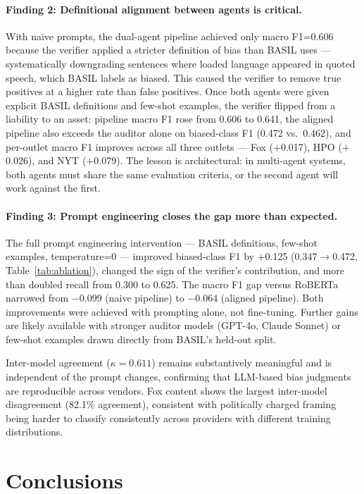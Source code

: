 \documentclass[11pt]{article}
\begin{document}
\paragraph{Finding 2: Definitional alignment between agents is critical.}
With naive prompts, the dual-agent pipeline achieved only macro F1{=}0.606 because the verifier applied a stricter definition of bias than BASIL uses --- systematically downgrading sentences where loaded language appeared in quoted speech, which BASIL labels as biased. This caused the verifier to remove true positives at a higher rate than false positives. Once both agents were given explicit BASIL definitions and few-shot examples, the verifier flipped from a liability to an asset: pipeline macro F1 rose from 0.606 to 0.641, the aligned pipeline also exceeds the auditor alone on biased-class F1 (0.472 vs.\ 0.462), and per-outlet macro F1 improves across all three outlets --- Fox ($+$0.017), HPO ($+$0.026), and NYT ($+$0.079). The lesson is architectural: in multi-agent systems, both agents must share the same evaluation criteria, or the second agent will work against the first.

\paragraph{Finding 3: Prompt engineering closes the gap more than expected.}
The full prompt engineering intervention --- BASIL definitions, few-shot examples, temperature{=}0 --- improved biased-class F1 by $+$0.125 (0.347$\rightarrow$0.472, Table~\ref{tab:ablation}), changed the sign of the verifier's contribution, and more than doubled recall from 0.300 to 0.625. The macro F1 gap versus RoBERTa narrowed from $-$0.099 (naive pipeline) to $-$0.064 (aligned pipeline). Both improvements were achieved with prompting alone, not fine-tuning. Further gains are likely available with stronger auditor models (GPT-4o, Claude Sonnet) or few-shot examples drawn directly from BASIL's held-out split.

Inter-model agreement ($\kappa{=}0.611$) remains substantively meaningful and is independent of the prompt changes, confirming that LLM-based bias judgments are reproducible across vendors. Fox content shows the largest inter-model disagreement (82.1\% agreement), consistent with politically charged framing being harder to classify consistently across providers with different training distributions.

\section{Conclusions}
\end{document}

